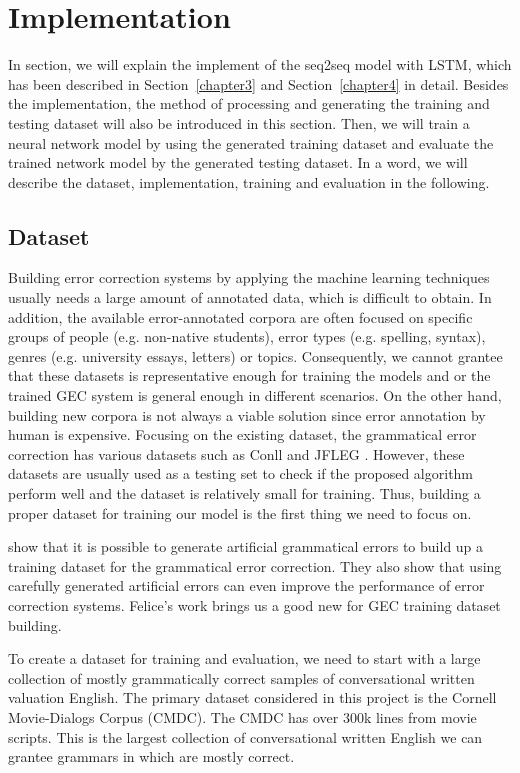 \chapter{Implementation}
\label{chapter5}


In section, we will explain the implement of the seq2seq model with LSTM, which has been described in Section~\ref{chapter3} and Section~\ref{chapter4} in detail. Besides the implementation, the method of processing and generating the training and testing dataset will also be introduced in this section. Then, we will train a neural network model by using the generated training dataset and evaluate the trained network model by the generated testing dataset. In a word, we will describe the dataset, implementation, training and evaluation in the following.

\section{Dataset}
Building error correction systems by applying the machine learning techniques usually needs a large amount of annotated data, which is difficult to obtain. In addition, the available error-annotated corpora are often focused on specific groups of people (e.g. non-native students), error types (e.g. spelling, syntax), genres (e.g. university essays, letters) or topics. Consequently, we cannot grantee that these datasets is representative enough for training the models and or the trained GEC system is general enough in different scenarios. On the other hand, building new corpora is not always a viable solution since error annotation by human is expensive. Focusing on the existing dataset, the grammatical error correction has various datasets such as Conll and JFLEG \cite{ng2014conll,napoles2017jfleg}. However, these datasets are usually used as a testing set to check if the proposed algorithm perform well and the dataset is relatively small for training. Thus, building a proper dataset for training our model is the first thing we need to focus on.

\cite{felice2014generating} show that it is possible to generate artificial grammatical errors to build up a training dataset for the grammatical error correction. They also show that using carefully generated artificial errors can even improve the performance of error correction systems. Felice’s work brings us a good new for GEC training dataset building.

To create a dataset for training and evaluation, we need to start with a large collection of mostly grammatically correct samples of conversational written valuation English. The primary dataset considered in this project is the Cornell Movie-Dialogs Corpus (CMDC). The CMDC has over 300k lines from movie scripts. This is the largest collection of conversational written English we can grantee grammars in which are mostly correct.

